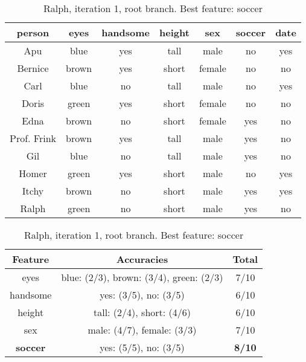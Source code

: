 \begin{table}[h!]
  \centering
  \begin{tabular}{cccccc|c}
    \toprule
    person      & eyes  & handsome & height & sex    & soccer & date\\
    \midrule
    Apu         & blue  & yes      & tall   & male   & no     & yes \\
    Bernice     & brown & yes      & short  & female & no     & no  \\
    Carl        & blue  & no       & tall   & male   & no     & yes \\
    Doris       & green & yes      & short  & female & no     & no  \\
    Edna        & brown & no       & short  & female & yes    & no  \\
    Prof. Frink & brown & yes      & tall   & male   & yes    & no  \\
    Gil         & blue  & no       & tall   & male   & yes    & no  \\
    Homer       & green & yes      & short  & male   & no     & yes \\
    Itchy       & brown & no       & short  & male   & yes    & yes \\
    Ralph       & green & no       & short  & male   & yes    & no  \\
    \bottomrule
  \end{tabular}

  \vspace{.5cm}

  \begin{tabular}{ccc}
    \toprule
    Feature         & Accuracies                              & Total\\
    \midrule
    eyes            & blue: (2/3), brown: (3/4), green: (2/3) & 7/10\\
    handsome        & yes: (3/5), no: (3/5)                   & 6/10\\
    height          & tall: (2/4), short: (4/6)               & 6/10\\
    sex             & male: (4/7), female: (3/3)              & 7/10\\
    \textbf{soccer} & yes: (5/5), no: (3/5)                   & \textbf{8/10}\\
    \bottomrule
  \end{tabular}
  \caption*{Ralph, iteration 1, root branch. Best feature: soccer}
\end{table}

